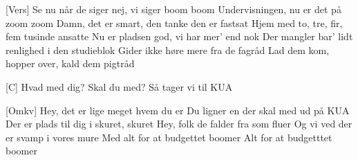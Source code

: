 \documentclass[a4paper,11pt]{article}
\begin{document}
\begin{song}
[Vers] Se nu når de siger nej, vi siger boom boom
    Undervisningen, nu er det på zoom zoom
    Damn, det er smart, den tanke den er fastsat
    Hjem med to, tre, fir, fem tusinde ansatte
    Nu er pladsen god, vi har mer' end nok
    Der mangler bar' lidt renlighed i den studieblok
    Gider ikke høre mere fra de fagråd
    Lad dem kom, hopper over, kald dem pigtråd


[C] Hvad med dig? Skal du med? Så tager vi til KUA

[Omkv] Hey, det er lige meget hvem du er
    Du ligner en der skal med ud på KUA
    Der er plads til dig i skuret, skuret
    Hey, folk de falder fra som fluer
    Og vi ved der er svamp i vores mure
    Med alt for at budgettet boomer
    Alt for at budgetttet boomer
\end{song}
\end{document}

